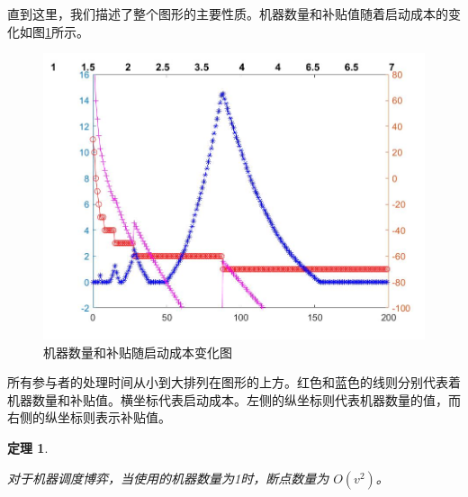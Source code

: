 \documentclass[UTF8]{article}
\newtheorem{thm}{\hspace{2em}定理}
\begin{document}
直到这里，我们描述了整个图形的主要性质。机器数量和补贴值随着启动成本的变化如图\ref{fig:Image1}所示。

\begin{figure}[h]%
	\centering  %
	\includegraphics[width=0.8\linewidth]{Figures/Image30}  %
	\caption{机器数量和补贴随启动成本变化图}  %
	\label{fig:Image1}   %
\end{figure}

所有参与者的处理时间从小到大排列在图形的上方。红色和蓝色的线则分别代表着机器数量和补贴值。横坐标代表启动成本。左侧的纵坐标则代表机器数量的值，而右侧的纵坐标则表示补贴值。


\begin{thm}\label{thm4}

对于机器调度博弈，当使用的机器数量为1时，断点数量为 $O(v^2)$。
\end{thm}
\end{document}
